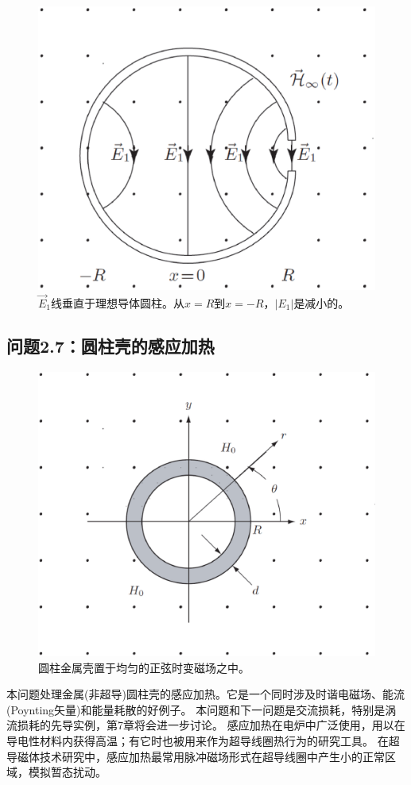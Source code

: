 \begin{figure}[htbp]
  \centering
 \includegraphics[scale=0.35]{chpt2/figs/fig2.10.eps}
  \caption{$\vec{E}_1$线垂直于理想导体圆柱。从$x=R$到$x=-R$，$|E_1|$是减小的。}
\end{figure}


\subsection{问题2.7：圆柱壳的感应加热}
\begin{figure}[htbp]
  \centering
 \includegraphics[scale=0.35]{chpt2/figs/fig2.11.eps}
  \caption{圆柱金属壳置于均匀的正弦时变磁场之中。}
\end{figure}
本问题处理金属(非超导)圆柱壳的感应加热。它是一个同时涉及时谐电磁场、能流(Poynting矢量)和能量耗散的好例子。
本问题和下一问题是交流损耗，特别是涡流损耗的先导实例，第7章将会进一步讨论。
感应加热在电炉中广泛使用，用以在导电性材料内获得高温；有它时也被用来作为超导线圈热行为的研究工具。
在超导磁体技术研究中，感应加热最常用脉冲磁场形式在超导线圈中产生小的正常区域，模拟暂态扰动。

